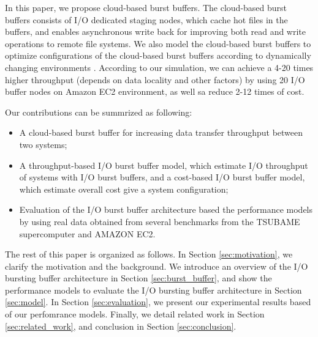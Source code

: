In this paper, we propose cloud-based burst buffers. The cloud-based burst buffers consists of I/O dedicated staging nodes, which cache hot files in the buffers, and enables asynchronous write back for improving both read and write operations to remote file systems.
We also model the cloud-based burst buffers to optimize  configurations of the cloud-based burst buffers according to dynamically changing environments
.
According to our simulation, we can achieve a 4-20 times higher throughput (depends on data locality and other factors) by using 20 I/O buffer nodes on Amazon EC2 environment, as well sa reduce 2-12 times of cost.


Our contributions can be summrized as following:
\begin{itemize}
	\item A cloud-based burst buffer for increasing data transfer throughput between two systems;
	\item A throughput-based I/O burst buffer model, which estimate I/O throughput of systems with I/O burst buffers, and a cost-based I/O burst buffer model, which estimate overall cost give a system configuration;
        \item Evaluation of the I/O burst buffer architecture based the performance models by using real data obtained from several benchmarks from the TSUBAME supercomputer and AMAZON EC2.
\end{itemize}
The rest of this paper is organized as follows. 
In Section \ref{sec:motivation}, we clarify the motivation and the background.
We introduce an overview of the I/O bursting buffer architecture in Section \ref{sec:burst_buffer}, 
and show the performance models to evaluate the I/O bursting buffer architecture in Section \ref{sec:model}. 
In Section \ref{sec:evaluation}, we present our experimental results based of our perfomrance models. %
Finally, we detail related work in Section \ref{sec:related_work}, and conclusion in Section \ref{sec:conclusion}.
